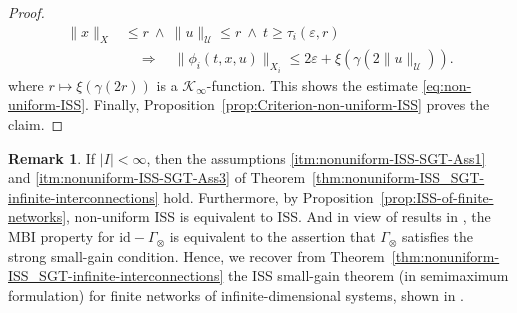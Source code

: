 \documentclass[twocolumn]{IEEEtran} %
\theoremstyle{definition}
\newtheorem{remark}[theorem]{Remark}
\newcommand{\Uc}{\mathcal{U}}%
\newcommand{\Kinf}{\mathcal{K_\infty}}%
\newcommand{\ep}{\varepsilon}%
\newcommand{\id}{\mathrm{id}}%
\newcommand \qrq   {\quad\Rightarrow\quad}
\newcommand \srs   {\ \ \Rightarrow\ \ }
\begin{document}
\begin{proof}
\begin{align}
\|x\|_X&\leq r\ \wedge \ \|u\|_\Uc \leq r \ \wedge \ t\geq\tau_i(\ep,r) \nonumber\\
&\qrq \|\phi_i(t, x, u)\|_{X_i} \leq 2\ep + \xi(\gamma(2 \|u\|_\Uc)).
\label{eq:non-uniform-bUAG-est-NU-SGT}
\end{align}
where $r\mapsto \xi(\gamma(2 r))$ is a $\Kinf$-function. This shows the estimate \eqref{eq:non-uniform-ISS}.
Finally, Proposition~\ref{prop:Criterion-non-uniform-ISS} proves the claim.
\end{proof}

\begin{remark}
\label{rem:Finitely-many-systems} 
If $|I|<\infty$, then the assumptions \ref{itm:nonuniform-ISS-SGT-Ass1} and \ref{itm:nonuniform-ISS-SGT-Ass3} of 
Theorem~\ref{thm:nonuniform-ISS_SGT-infinite-interconnections} hold. Furthermore, by Proposition~\ref{prop:ISS-of-finite-networks},
non-uniform ISS is equivalent to ISS. And in view of results in \cite{MKG20}, the MBI property for $\id - \Gamma_\otimes$ is equivalent to the assertion that $\Gamma_\otimes$ satisfies the strong small-gain condition.
Hence, we recover from Theorem~\ref{thm:nonuniform-ISS_SGT-infinite-interconnections} the ISS small-gain theorem (in semimaximum formulation) for finite networks of infinite-dimensional systems, shown in \cite{Mir19b}.
\end{remark}
\end{document}
